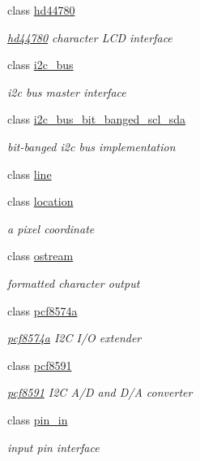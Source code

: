 \begin{DoxyCompactItemize}
class \hyperlink{classhwlib_1_1hd44780}{hd44780}
\begin{DoxyCompactList}\small\item\em \hyperlink{classhwlib_1_1hd44780}{hd44780} character L\+CD interface \end{DoxyCompactList}\item 
class \hyperlink{classhwlib_1_1i2c__bus}{i2c\+\_\+bus}
\begin{DoxyCompactList}\small\item\em i2c bus master interface \end{DoxyCompactList}\item 
class \hyperlink{classhwlib_1_1i2c__bus__bit__banged__scl__sda}{i2c\+\_\+bus\+\_\+bit\+\_\+banged\+\_\+scl\+\_\+sda}
\begin{DoxyCompactList}\small\item\em bit-\/banged i2c bus implementation \end{DoxyCompactList}\item 
class \hyperlink{classhwlib_1_1line}{line}
\item 
class \hyperlink{classhwlib_1_1location}{location}
\begin{DoxyCompactList}\small\item\em a pixel coordinate \end{DoxyCompactList}\item 
class \hyperlink{classhwlib_1_1ostream}{ostream}
\begin{DoxyCompactList}\small\item\em formatted character output \end{DoxyCompactList}\item 
class \hyperlink{classhwlib_1_1pcf8574a}{pcf8574a}
\begin{DoxyCompactList}\small\item\em \hyperlink{classhwlib_1_1pcf8574a}{pcf8574a} I2C I/O extender \end{DoxyCompactList}\item 
class \hyperlink{classhwlib_1_1pcf8591}{pcf8591}
\begin{DoxyCompactList}\small\item\em \hyperlink{classhwlib_1_1pcf8591}{pcf8591} I2C A/D and D/A converter \end{DoxyCompactList}\item 
class \hyperlink{classhwlib_1_1pin__in}{pin\+\_\+in}
\begin{DoxyCompactList}\small\item\em input pin interface \end{DoxyCompactList}\item 

\end{DoxyCompactItemize}
